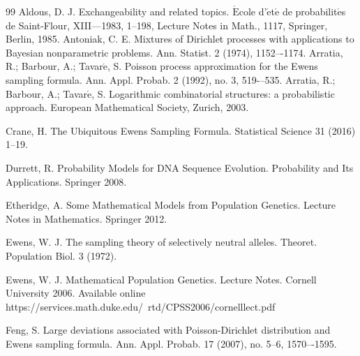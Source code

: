 \documentclass[12pt]{amsart}
\theoremstyle{definition}
\numberwithin{equation}{section}
\begin{document}
\begin{thebibliography}{99}
Aldous, D. J. Exchangeability and related topics. $\acute{\mbox{E}}$cole d'$\acute{\mbox{e}}$t$\acute{\mbox{e}}$ de probabilit$\acute{\mbox{e}}$s de Saint-Flour, XIII—1983, 1–198, Lecture Notes in Math., 1117, Springer, Berlin, 1985.
 Antoniak, C. E. Mixtures of Dirichlet processes with applications to Bayesian nonparametric problems. Ann. Statist. 2 (1974), 1152–-1174.
Arratia, R.; Barbour, A.; Tavar$\acute{\mbox{e}}$, S.
Poisson process approximation for the Ewens sampling formula. Ann. Appl. Probab. 2 (1992), no. 3, 519-–535.
 Arratia, R.; Barbour, A.; Tavar$\acute{\mbox{e}}$, S. Logarithmic combinatorial structures: a probabilistic approach. European Mathematical Society, Zurich, 2003.

 Crane, H. The Ubiquitous Ewens Sampling
Formula. Statistical Science 31 (2016) 1--19.

 Durrett, R. Probability Models for DNA Sequence Evolution.
Probability and Its Applications. Springer 2008.

 Etheridge, A. Some Mathematical Models from Population Genetics. Lecture Notes in Mathematics. Springer 2012.

Ewens, W. J. The sampling theory of selectively neutral alleles. Theoret. Population Biol. 3 (1972).

 Ewens, W. J. Mathematical Population Genetics.
Lecture Notes. Cornell University 2006. Available online
https://services.math.duke.edu/~rtd/CPSS2006/cornelllect.pdf


 Feng, S. Large deviations associated with Poisson-Dirichlet distribution and Ewens sampling formula.
Ann. Appl. Probab. 17 (2007), no. 5--6, 1570–-1595.


\end{thebibliography}
\end{document}
